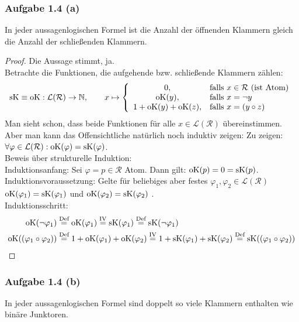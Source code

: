 \subsubsection{Aufgabe 1.4 (a)}
In jeder aussagenlogischen Formel ist die Anzahl der öffnenden Klammern gleich
die Anzahl der schließenden Klammern.

\begin{proof}
	Die Aussage stimmt, ja.\\
	Betrachte die Funktionen, die aufgehende bzw. schließende Klammern zählen:
	\begin{align*}
		\operatorname{sK}\equiv\operatorname{oK}:\mathcal{L}(\mathcal{R})\to\mathbb{N},\qquad
		x\mapsto\left\lbrace\begin{array}{cl}
			0, & \text{falls } x\in\mathcal{R}\text{ (ist Atom)}\\
			\operatorname{oK}(y), & \text{falls } x=\neg y\\
			1+\operatorname{oK}(y)+\operatorname{oK}(z), & \text{falls } x=(y\circ z)
		\end{array}\right.
	\end{align*}
	Man sieht schon, dass beide Funktionen für alle $x\in\mathcal{L}(\mathcal{R})$ übereinstimmen. 
	Aber man kann das Offensichtliche natürlich noch induktiv zeigen:\nl
	Zu zeigen: $\forall\varphi\in\mathcal{L}(\mathcal{R}):\operatorname{oK}(\varphi)=\operatorname{sK}(\varphi)$.\\
	Beweis über strukturelle Induktion:\\
	Induktionsanfang: Sei $\varphi=p\in\mathcal{R}$ Atom. Dann gilt: $\operatorname{oK}(p)=0=\operatorname{sK}(p)$.\\
	Induktionsvoraussetzung: Gelte für beliebiges aber festes 
	$\varphi_1,\varphi_2\in\mathcal{L}(\mathcal{R})$\\ $\operatorname{oK}(\varphi_1)=\operatorname{sK}(\varphi_1)$ und $\operatorname{oK}(\varphi_2)=\operatorname{sK}(\varphi_2)$ .\\ 
	Induktionsschritt:
	\begin{align*}
		\operatorname{oK}(\neg \varphi_1)
		&\overset{\text{Def}}{=}\operatorname{oK}(\varphi_1)
		\overset{\text{IV}}{=}\operatorname{sK}(\varphi_1)
		\overset{\text{Def}}{=}\operatorname{sK}(\neg \varphi_1)\\
		\operatorname{oK}((\varphi_1\circ \varphi_2))
		&\overset{\text{Def}}{=}1+\operatorname{oK}(\varphi_1)+\operatorname{oK}(\varphi_2)
		\overset{\text{IV}}{=}1+\operatorname{sK}(\varphi_1)+\operatorname{sK}(\varphi_2)
		\overset{\text{Def}}{=}\operatorname{sK}((\varphi_1\circ \varphi_2))
	\end{align*}
\end{proof}

\subsubsection{Aufgabe 1.4 (b)}
In jeder aussagenlogischen Formel sind doppelt so viele Klammern enthalten wie
binäre Junktoren.

